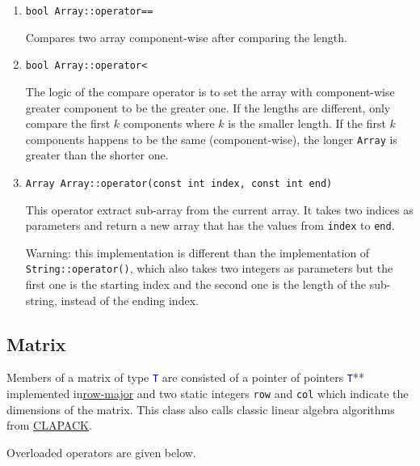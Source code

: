 \documentclass[11pt,a4paper]{article}
\newcommand{\ttype}[1]{\textcolor{blue}{\texttt{#1}}}
\theoremstyle{definition}
\theoremstyle{definition}
\numberwithin{equation}{section}
\begin{document}
\begin{enumerate}
		\item \texttt{bool Array::operator==}
		
		Compares two array component-wise after comparing the length.
		
		\item \texttt{bool Array::operator<}
		
		The logic of the compare operator is to set the array with component-wise greater component to be the greater one. If the lengths are different, only compare the first $k$ components where $k$ is the smaller length. If the first $k$ components happens to be the same (component-wise), the longer \texttt{Array} is greater than the shorter one. 
		
		\item \texttt{Array Array::operator(const int index, const int end)}
		
		This operator extract sub-array from the current array. It takes two indices as parameters and return a new array that has the values from \texttt{index} to \texttt{end}.
		
		Warning: this implementation is different than the implementation of \texttt{String::operator()}, which also takes two integers as parameters but the first one is the starting index and the second one is the length of the sub-string, instead of the ending index.
		
	\end{enumerate}
	
	\subsection{Matrix}
	
	Members of a matrix of type \ttype{T} are consisted of a pointer of pointers \ttype{T}** implemented in\href{https://en.wikipedia.org/wiki/Row-_and_column-major_order}{row-major} and two static integers \texttt{row} and \texttt{col} which indicate the dimensions of the matrix. This class also calls classic linear algebra algorithms from \href{https://www.netlib.org/clapack/}{CLAPACK}. 
	
	Overloaded operators are given below.
	
\end{document}
